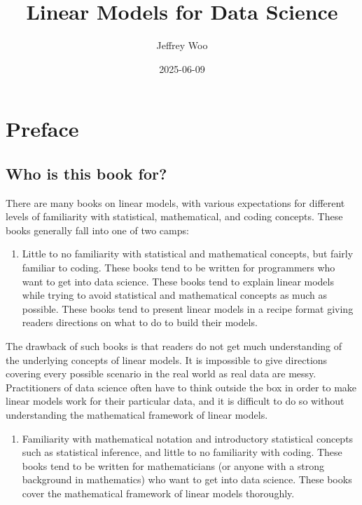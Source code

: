 \documentclass[
]{book}
\title{Linear Models for Data Science}
\author{Jeffrey Woo}
\date{2025-06-09}
\providecommand{\tightlist}{%
  \setlength{\itemsep}{0pt}\setlength{\parskip}{0pt}}
\begin{document}
\maketitle

{
\setcounter{tocdepth}{1}
\tableofcontents
}
\chapter*{Preface}\label{preface}

\section*{Who is this book for?}\label{who-is-this-book-for}

There are many books on linear models, with various expectations for different levels of familiarity with statistical, mathematical, and coding concepts. These books generally fall into one of two camps:

\begin{enumerate}
\def\labelenumi{\arabic{enumi}.}
\tightlist
\item
  Little to no familiarity with statistical and mathematical concepts, but fairly familiar to coding. These books tend to be written for programmers who want to get into data science. These books tend to explain linear models while trying to avoid statistical and mathematical concepts as much as possible. These books tend to present linear models in a recipe format giving readers directions on what to do to build their models.
\end{enumerate}

The drawback of such books is that readers do not get much understanding of the underlying concepts of linear models. It is impossible to give directions covering every possible scenario in the real world as real data are messy. Practitioners of data science often have to think outside the box in order to make linear models work for their particular data, and it is difficult to do so without understanding the mathematical framework of linear models.

\begin{enumerate}
\def\labelenumi{\arabic{enumi}.}
\setcounter{enumi}{1}
\tightlist
\item
  Familiarity with mathematical notation and introductory statistical concepts such as statistical inference, and little to no familiarity with coding. These books tend to be written for mathematicians (or anyone with a strong background in mathematics) who want to get into data science. These books cover the mathematical framework of linear models thoroughly.
\end{enumerate}
\end{document}
